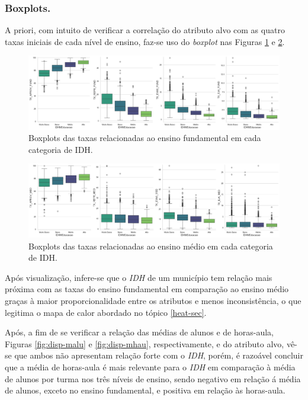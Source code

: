 \subsubsection{Boxplots.}

\par A priori, com intuito de verificar a correlação do atributo alvo com as quatro taxas iniciais de cada nível de ensino, faz-se uso do \textit{boxplot} nas Figuras \ref{fig:box-fund} e \ref{fig:box-med}.

\begin{figure}[H]
    \centering
    \includegraphics[scale = 0.3]{Graphics/BoxFundamentalIDH.png}
    \caption{Boxplots das taxas relacionadas ao ensino fundamental em cada categoria de IDH.}
    \label{fig:box-fund}
\end{figure}

\begin{figure}[H]
    \centering
    \includegraphics[scale = 0.3]{Graphics/BoxMedioIDH.png}
    \caption{Boxplots das taxas relacionadas ao ensino médio em cada categoria de IDH.}
    \label{fig:box-med}
\end{figure}

\par Após visualização, infere-se que o \textit{IDH} de um município tem relação mais próxima com as taxas do ensino fundamental em comparação ao ensino médio graças à maior proporcionalidade entre os atributos e menos inconsistência, o que legitima o mapa de calor abordado no tópico \ref{heat-sec}.

\par Após, a fim de se verificar a relação das médias de alunos e de horas-aula, Figuras \ref{fig:disp-malu} e \ref{fig:disp-mhau}, respectivamente, e do atributo alvo, vê-se que ambos não apresentam relação forte com o \textit{IDH}, porém, é razoável concluir que a média de horas-aula é mais relevante para o \textit{IDH} em comparação à média de alunos por turma nos três níveis de ensino, sendo negativo em relação á média de alunos, exceto no ensino fundamental, e positiva em relação às horas-aula.

